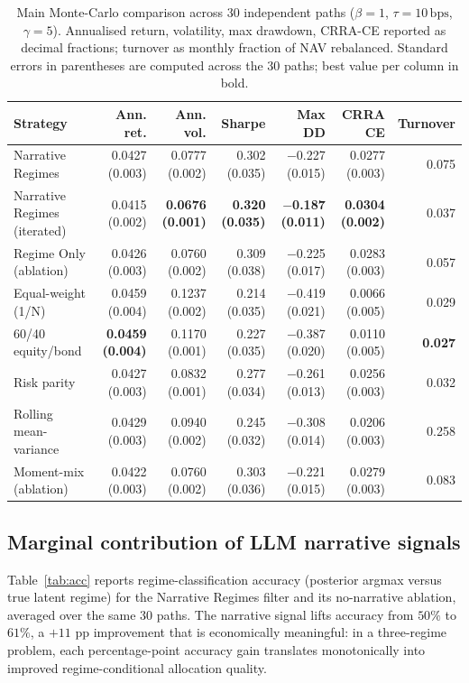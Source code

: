 \documentclass[review,12pt,authoryear]{elsarticle}
\begin{document}
\begin{table}[t]
\centering
\caption{Main Monte-Carlo comparison across 30 independent paths
($\beta=1$, $\tau=10\,\mathrm{bps}$, $\gamma=5$). Annualised return, volatility, max
drawdown, CRRA-CE reported as decimal fractions; turnover as monthly fraction of NAV
rebalanced. Standard errors in parentheses are computed across the 30 paths; best value per column
in bold.}
\label{tab:main}
\small
\begin{tabular}{lrrrrrr}
\toprule
Strategy & Ann. ret. & Ann. vol. & Sharpe & Max DD & CRRA CE & Turnover \\
\midrule
Narrative Regimes            & 0.0427 (0.003) & 0.0777 (0.002) & 0.302 (0.035) & $-$0.227 (0.015) & 0.0277 (0.003) & 0.075 \\
Narrative Regimes (iterated) & 0.0415 (0.002) & \textbf{0.0676 (0.001)} & \textbf{0.320 (0.035)} & \textbf{$-$0.187 (0.011)} & \textbf{0.0304 (0.002)} & 0.037 \\
Regime Only (ablation)       & 0.0426 (0.003) & 0.0760 (0.002) & 0.309 (0.038) & $-$0.225 (0.017) & 0.0283 (0.003) & 0.057 \\
Equal-weight (1/N)           & 0.0459 (0.004) & 0.1237 (0.002) & 0.214 (0.035) & $-$0.419 (0.021) & 0.0066 (0.005) & 0.029 \\
60/40 equity/bond            & \textbf{0.0459 (0.004)} & 0.1170 (0.001) & 0.227 (0.035) & $-$0.387 (0.020) & 0.0110 (0.005) & \textbf{0.027} \\
Risk parity                  & 0.0427 (0.003) & 0.0832 (0.001) & 0.277 (0.034) & $-$0.261 (0.013) & 0.0256 (0.003) & 0.032 \\
Rolling mean-variance        & 0.0429 (0.003) & 0.0940 (0.002) & 0.245 (0.032) & $-$0.308 (0.014) & 0.0206 (0.003) & 0.258 \\
Moment-mix (ablation)        & 0.0422 (0.003) & 0.0760 (0.002) & 0.303 (0.036) & $-$0.221 (0.015) & 0.0279 (0.003) & 0.083 \\
\bottomrule
\end{tabular}
\end{table}

\subsection{Marginal contribution of LLM narrative signals}
Table~\ref{tab:acc} reports regime-classification accuracy (posterior argmax versus true
latent regime) for the Narrative Regimes filter and its no-narrative ablation, averaged
over the same 30 paths. The narrative signal lifts accuracy from $50\%$ to $61\%$, a
$+11$ pp improvement that is economically meaningful: in a three-regime problem, each
percentage-point accuracy gain translates monotonically into improved regime-conditional
allocation quality.
\end{document}
